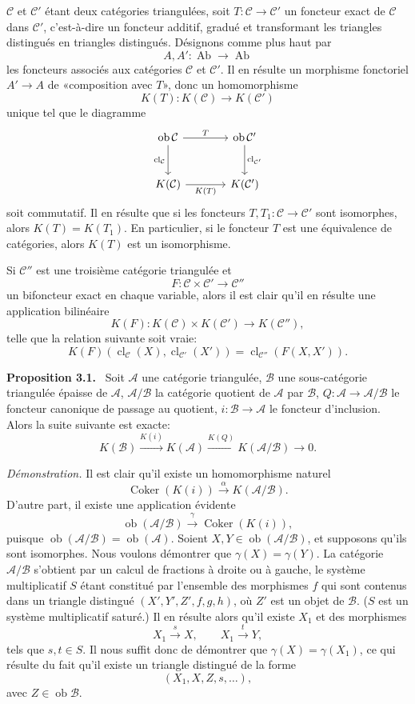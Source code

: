 \documentclass[11pt]{article}
\newenvironment{statement}[1]{\par\medskip\noindent\textbf{#1.}\ }{\par\medskip}
\providecommand{\Ob}{\operatorname{ob}}
\providecommand{\cC}{\mathcal C}
\providecommand{\Ob}{\operatorname{ob}}
\providecommand{\Ab}{\operatorname{Ab}}
\providecommand{\cC}{\mathcal C}
\providecommand{\cA}{\mathcal A}
\providecommand{\cB}{\mathcal B}
\providecommand{\Ab}{\operatorname{Ab}}
\providecommand{\Ob}{\operatorname{Ob}}
\providecommand{\Ob}{\operatorname{ob}}
\begin{document}
$\cC$ et $\cC'$ étant deux catégories triangulées, soit $T:\cC\to\cC'$ un foncteur exact de $\cC$ dans $\cC'$, c'est-à-dire un foncteur additif, gradué et transformant les triangles distingués en triangles distingués. Désignons comme plus haut par
\[
A,A':\Ab\longrightarrow\Ab
\]
les foncteurs associés aux catégories $\cC$ et $\cC'$. Il en résulte un morphisme fonctoriel $A'\to A$ de «composition avec $T$», donc un homomorphisme
\[
K(T):K(\cC)\longrightarrow K(\cC')
\]
unique tel que le diagramme
\[
\begin{tikzcd}[column sep=large,row sep=large]
\Ob\cC \arrow[r,"T"] \arrow[d,"\operatorname{cl}_{\cC}"']&
\Ob\cC' \arrow[d,"\operatorname{cl}_{\cC'}"]\\
K(\cC) \arrow[r,"K(T)"']& K(\cC')
\end{tikzcd}
\]
soit commutatif. Il en résulte que si les foncteurs $T,T_1:\cC\to\cC'$ sont isomorphes, alors $K(T)=K(T_1)$. En particulier, si le foncteur $T$ est une équivalence de catégories, alors $K(T)$ est un isomorphisme.

Si $\cC''$ est une troisième catégorie triangulée et
\[
F:\cC\times\cC'\longrightarrow \cC''
\]
un bifoncteur exact en chaque variable, alors il est clair qu'il en résulte une application bilinéaire
\[
K(F):K(\cC)\times K(\cC')\longrightarrow K(\cC''),
\]
telle que la relation suivante soit vraie:
\[
K(F)(\operatorname{cl}_{\cC}(X),\operatorname{cl}_{\cC'}(X'))
=
\operatorname{cl}_{\cC''}(F(X,X')).
\]

\begin{statement}{Proposition 3.1}
Soit $\cA$ une catégorie triangulée, $\cB$ une sous-catégorie triangulée épaisse de $\cA$, $\cA/\cB$ la catégorie quotient de $\cA$ par $\cB$, $Q:\cA\to\cA/\cB$ le foncteur canonique de passage au quotient, $i:\cB\to\cA$ le foncteur d'inclusion. Alors la suite suivante est exacte:
\[
K(\cB)\xrightarrow{K(i)}K(\cA)\xrightarrow{K(Q)}K(\cA/\cB)\longrightarrow 0.
\]
\end{statement}

\emph{Démonstration.} Il est clair qu'il existe un homomorphisme naturel
\[
\operatorname{Coker}(K(i))\xrightarrow{\alpha}K(\cA/\cB).
\]
D'autre part, il existe une application évidente
\[
\Ob(\cA/\cB)\xrightarrow{\gamma}\operatorname{Coker}(K(i)),
\]
puisque $\Ob(\cA/\cB)=\Ob(\cA)$. Soient $X,Y\in\Ob(\cA/\cB)$, et supposons qu'ils sont isomorphes. Nous voulons démontrer que $\gamma(X)=\gamma(Y)$. La catégorie $\cA/\cB$ s'obtient par un calcul de fractions à droite ou à gauche, le système multiplicatif $S$ étant constitué par l'ensemble des morphismes $f$ qui sont contenus dans un triangle distingué $(X',Y',Z',f,g,h)$, où $Z'$ est un objet de $\cB$. ($S$ est un système multiplicatif saturé.) Il en résulte alors qu'il existe $X_1$ et des morphismes
\[
X_1\xrightarrow{s}X,\qquad X_1\xrightarrow{t}Y,
\]
tels que $s,t\in S$. Il nous suffit donc de démontrer que $\gamma(X)=\gamma(X_1)$, ce qui résulte du fait qu'il existe un triangle distingué de la forme
\[
(X_1,X,Z,s,\ldots),
\]
avec $Z\in\Ob\cB$.
\end{document}
